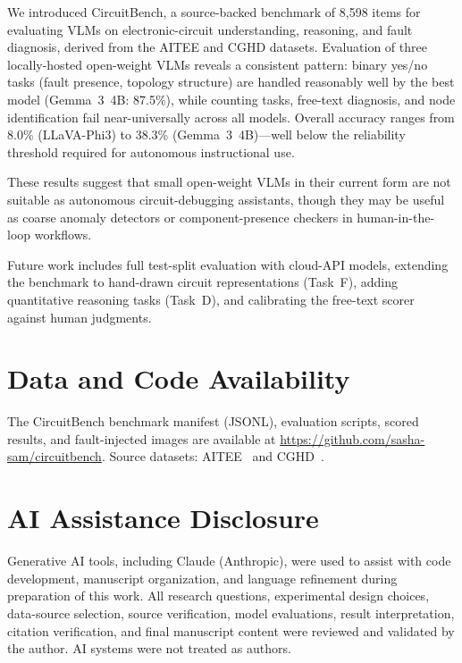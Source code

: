 \documentclass[conference]{IEEEtran}
\begin{document}
We introduced CircuitBench, a source-backed benchmark of 8,598 items
for evaluating VLMs on electronic-circuit understanding, reasoning, and
fault diagnosis, derived from the AITEE and CGHD datasets.
Evaluation of three locally-hosted open-weight VLMs reveals a
consistent pattern: binary yes/no tasks (fault presence, topology
structure) are handled reasonably well by the best model (Gemma~3~4B:
87.5\%), while counting tasks, free-text diagnosis, and node
identification fail near-universally across all models.
Overall accuracy ranges from 8.0\% (LLaVA-Phi3) to 38.3\%
(Gemma~3~4B)---well below the reliability threshold required for
autonomous instructional use.

These results suggest that small open-weight VLMs in their current
form are not suitable as autonomous circuit-debugging assistants,
though they may be useful as coarse anomaly detectors or
component-presence checkers in human-in-the-loop workflows.

Future work includes full test-split evaluation with cloud-API models,
extending the benchmark to hand-drawn circuit representations (Task~F),
adding quantitative reasoning tasks (Task~D), and calibrating the
free-text scorer against human judgments.


\section*{Data and Code Availability}

The CircuitBench benchmark manifest (JSONL), evaluation scripts,
scored results, and fault-injected images are available at
\url{https://github.com/sasha-sam/circuitbench}.
Source datasets: AITEE~\cite{knievel2025aitee_dataset} and
CGHD~\cite{thoma2025cghd}.


\section*{AI Assistance Disclosure}

Generative AI tools, including Claude (Anthropic), were used to assist
with code development, manuscript organization, and language refinement
during preparation of this work.
All research questions, experimental design choices, data-source
selection, source verification, model evaluations, result interpretation,
citation verification, and final manuscript content were reviewed and
validated by the author.
AI systems were not treated as authors.




\end{document}

